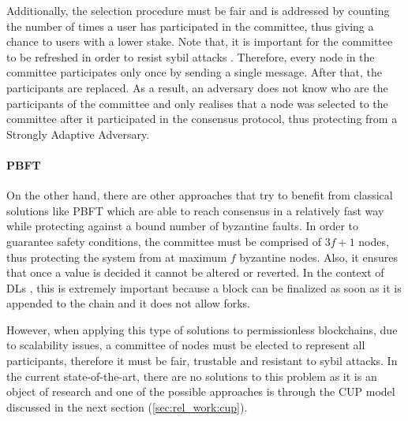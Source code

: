 Additionally, the selection procedure must be fair and is addressed by counting the number of times a user has participated in the committee, thus giving a chance to users with a lower stake. Note that, it is important for the committee to be refreshed in order to resist sybil attacks \cite{sybil_attack}. Therefore, every node in the committee participates only once by sending a single message. After that, the participants are replaced. As a result, an adversary does not know who are the participants of the committee and only realises that a node was selected to the committee after it participated in the consensus protocol, thus protecting from a Strongly Adaptive Adversary.


\paragraph{\gls{PBFT}}

On the other hand, there are other approaches that try to benefit from classical solutions like \gls{PBFT} \cite{pbft} which are able to reach consensus in a relatively fast way while protecting against a bound number of byzantine faults. In order to guarantee safety conditions, the committee must be comprised of $3f + 1$ nodes, thus protecting the system from at maximum $f$ byzantine nodes. Also, it ensures that once a value is decided it cannot be altered or reverted. In the context of \gls{DL}s \cite{hyperledger_sawtooth}, this is extremely important because a block can be finalized as soon as it is appended to the chain and it does not allow forks.

However, when applying this type of solutions to permissionless blockchains, due to scalability issues, a committee of nodes must be elected to represent all participants, therefore it must be fair, trustable and resistant to sybil attacks. In the current state-of-the-art, there are no solutions to this problem as it is an object of research \cite{research_self_adaptive_consensus, Rethinking_Large-Scale_Consensus} and one of the possible approaches is through the \gls{CUP} model \cite{cup_model} discussed in the next section (\ref{sec:rel_work:cup}). %

